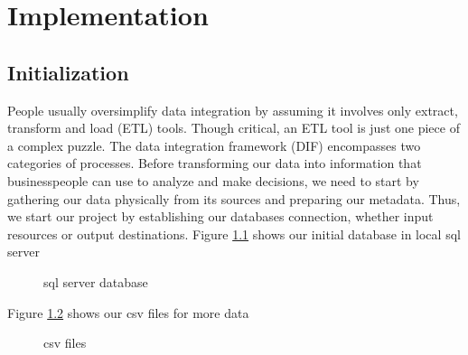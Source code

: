 \chapter{Implementation}


\section{Initialization}
People usually oversimplify data integration by assuming it involves only extract, transform and load (ETL) tools. Though critical, an ETL tool is just one piece of a complex puzzle.
The data integration framework (DIF) encompasses two categories of processes. Before transforming our data into information that businesspeople can use to analyze and make decisions, we need to start by gathering our data physically from its sources and preparing our metadata.
\vskip0.2cm
Thus, we start our project by establishing our databases connection, whether input resources or output destinations. 
\vskip0.2cm
Figure \ref{fig:ssmsDB} shows our initial database in local sql server
\begin{figure}[H]
\centering
{}
\caption{sql server database}
\label{fig:ssmsDB}
\end{figure}
\vskip0.2cm

\clearpage
Figure \ref{fig:csvDB} shows our csv files for more data
\begin{figure}[H]
\centering
{}
\caption{csv files}
\label{fig:csvDB}
\end{figure}

